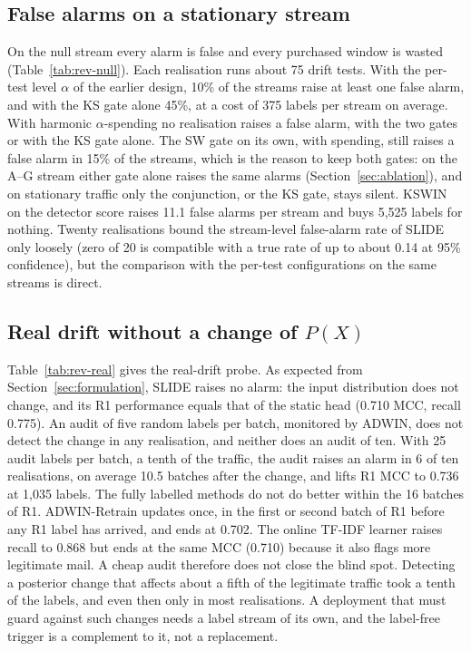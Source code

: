 \subsection{False alarms on a stationary stream}\label{sec:null}
On the null stream every alarm is false and every purchased window is wasted (Table~\ref{tab:rev-null}). Each realisation runs about 75 drift tests. With the per-test level $\alpha$ of the earlier design, 10\% of the streams raise at least one false alarm, and with the KS gate alone 45\%, at a cost of 375 labels per stream on average. With harmonic $\alpha$-spending no realisation raises a false alarm, with the two gates or with the KS gate alone. The SW gate on its own, with spending, still raises a false alarm in 15\% of the streams, which is the reason to keep both gates: on the A--G stream either gate alone raises the same alarms (Section~\ref{sec:ablation}), and on stationary traffic only the conjunction, or the KS gate, stays silent. KSWIN on the detector score raises 11.1 false alarms per stream and buys 5{,}525 labels for nothing. Twenty realisations bound the stream-level false-alarm rate of SLIDE only loosely (zero of 20 is compatible with a true rate of up to about 0.14 at 95\% confidence), but the comparison with the per-test configurations on the same streams is direct.



\subsection{Real drift without a change of $P(X)$}\label{sec:realdrift}
Table~\ref{tab:rev-real} gives the real-drift probe. As expected from Section~\ref{sec:formulation}, SLIDE raises no alarm: the input distribution does not change, and its R1 performance equals that of the static head (0.710 MCC, recall 0.775). An audit of five random labels per batch, monitored by ADWIN, does not detect the change in any realisation, and neither does an audit of ten. With 25 audit labels per batch, a tenth of the traffic, the audit raises an alarm in 6 of ten realisations, on average 10.5 batches after the change, and lifts R1 MCC to 0.736 at 1{,}035 labels. The fully labelled methods do not do better within the 16 batches of R1. ADWIN-Retrain updates once, in the first or second batch of R1 before any R1 label has arrived, and ends at 0.702. The online TF-IDF learner raises recall to 0.868 but ends at the same MCC (0.710) because it also flags more legitimate mail. A cheap audit therefore does not close the blind spot. Detecting a posterior change that affects about a fifth of the legitimate traffic took a tenth of the labels, and even then only in most realisations. A deployment that must guard against such changes needs a label stream of its own, and the label-free trigger is a complement to it, not a replacement.

